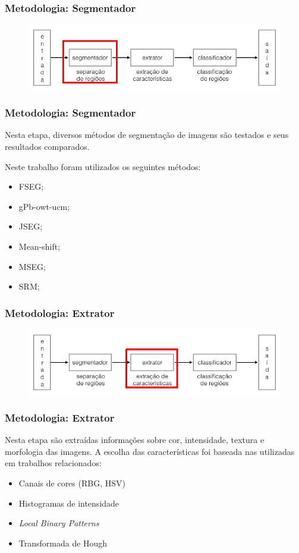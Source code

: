 \documentclass[t]{beamer}
\begin{document}
\begin{frame}[c]
	\frametitle{Metodologia: Segmentador}
	\begin{figure}[h]
    	\includegraphics[width=\textwidth]{imgs/arquitetura_2}
	\end{figure}
\end{frame}

\begin{frame}[c]
	\frametitle{Metodologia: Segmentador}

	Nesta etapa, diversos métodos de segmentação de imagens são testados e seus resultados comparados.

	\vspace{0.5cm}

	Neste trabalho foram utilizados os seguintes métodos:
	\begin{itemize}
		\item FSEG;
		\item gPb-owt-ucm;
		\item JSEG;
		\item Mean-shift;
		\item MSEG;
		\item SRM;
	\end{itemize}

\end{frame}

\begin{frame}[c]
	\frametitle{Metodologia: Extrator}
	\begin{figure}[h]
    	\includegraphics[width=\textwidth]{imgs/arquitetura_3}
	\end{figure}
\end{frame}

\begin{frame}[c]

	\frametitle{Metodologia: Extrator}

	Nesta etapa são extraídas informações sobre cor, intensidade, textura e morfologia das imagens. A escolha das características foi baseada nas utilizadas em trabalhos relacionados:

	\begin{itemize}
		\item Canais de cores (RBG, HSV)
		\item Histogramas de intensidade
		\item \textit{Local Binary Patterns}
		\item Transformada de Hough
	\end{itemize}
\end{frame}
\end{document}
